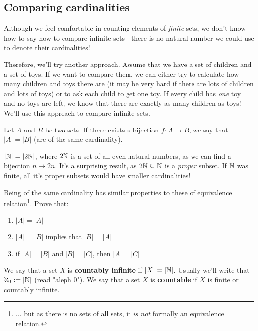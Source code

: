\subsection{Comparing cardinalities}
Although we feel comfortable in counting elements of \textit{finite} sets, we don't know how to say how to compare infinite sets - there is no natural number we could use to denote
their cardinalities!

Therefore, we'll try another approach. Assume that we have a set of children and a set of toys. If we want to compare them, we can either try to calculate how many children and toys there are (it may be very hard if there are lots of children and lots of toys) or to ask each child to get one toy. If every child has \textit{one} toy and no toys are left, we know
that there are exactly as many children as toys! We'll use this approach to compare infinite sets.

\begin{definition}
  Let $A$ and $B$ be two sets. If there exists a bijection $f:A\to B$, we say that $|A|=|B|$ (are of the same cardinality).
\end{definition}

\begin{example}
  $|\mathbb N|=|2\mathbb N|$, where $2\mathbb N$ is a set of all even natural numbers, as we can find a bijection $n\mapsto 2n$. It's a surprising result, as $2\mathbb N\subseteq \mathbb N$ is a \textit{proper} subset. If $\mathbb N$ was finite, all it's proper subsets would have smaller cardinalities!
\end{example}

\begin{exercise}
  Being of the same cardinality has similar properties to these of equivalence relation\footnote{... but as there is no sets of all sets, it \emph{is not} formally an equivalence relation.}. Prove that:
  \begin{enumerate}
    \item $|A|=|A|$
    \item $|A|=|B|$ implies that $|B|=|A|$ 
    \item if $|A|=|B|$ and $|B|=|C|$, then $|A|=|C|$ 
  \end{enumerate}
\end{exercise}

\begin{definition}
  We say that a set $X$ is \textbf{countably infinite} if $|X|=|\mathbb N|$. Usually we'll write that $\aleph_0:=|\mathbb N|$ (read "aleph 0").
  We say that a set $X$ is \textbf{countable} if $X$ is finite or countably infinite.
\end{definition}

